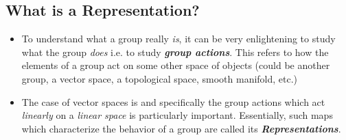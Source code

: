 \documentclass[11pt]{article}
\begin{document}
\subsection*{What is a Representation?}
\begin{itemize}
    \item To understand what a group really \emph{is}, it can be very enlightening to study what the group \emph{does} i.e. to study \emph{\textbf{group actions}}. This refers to how the elements of a group act on some other space of objects (could be another group, a vector space, a topological space, smooth manifold, etc.)
    \item The case of vector spaces is and specifically the group actions which act \emph{linearly} on a \emph{linear space} is particularly important. Essentially, such maps which characterize the behavior of a group are called its \emph{\textbf{Representations}}.
\end{itemize}



  


    
\end{document}
